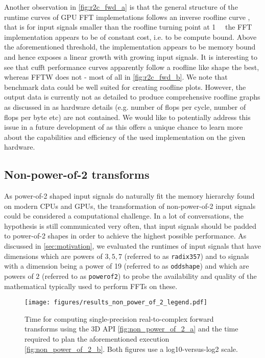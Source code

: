 Another observation in \cref{fig:r2c_fwd_a} is that the general structure of the runtime curves of GPU FFT implemetations follows an inverse roofline curve \cite{williams2009roofline}, that is for input signals smaller than the roofline turning point at \SI{1}{\mebi\byte} the FFT implementation appears to be of constant cost, i.e. to be compute bound. Above the aforementioned threshold, the implementation appears to be memory bound and hence exposes a linear growth with growing input signals. It is interesting to see that cufft performance curves apparently follow a roofline like shape the best, whereas FFTW does not - most of all in \cref{fig:r2c_fwd_b}.  We note that \gearshifft{} benchmark data could be well suited for creating roofline plots. However, the output data is currently not as detailed to produce comprehensive roofline graphs as discussed in \cite{ofenbeck2014applying} as hardware details (e.g. number of flops per cycle, number of flops per byte etc) are not contained. We would like to potentially address this issue in a future development of \gearshifft{} as this offers a unique chance to learn more about the capabilities and efficiency of the used implementation on the given hardware. 
 
\subsection{Non-power-of-2 transforms}
\label{ssec:nonpowerof2}

As power-of-2 shaped input signals do naturally fit the memory hierarchy found on modern CPUs and GPUs, the transformation of non-power-of-2 input signals could be considered a computational challenge. In a lot of conversations, the hypothesis is still communicated very often, that input signals should be padded to power-of-2 shapes in order to achieve the highest possible performance. As discussed in \cref{sec:motivation}, we evaluated the runtimes of input signals that have dimensions which are powers of $3,5,7$ (referred to as \texttt{radix357}) and to signals with a dimension being a power of 19 (referred to as \texttt{oddshape}) and which are powers of $2$ (referred to as \texttt{powerof2}) to probe the availability and quality of the mathematical typically used to perform FFTs on these. 

\begin{figure}[!tbp]
  \centering
  \texttt{[image: figures/results\_non\_power\_of\_2\_legend.pdf]}\vspace{-1em}
  \hfill
  \caption{Time for computing single-precision real-to-complex forward transforms using the 3D API \cref{fig:non_power_of_2_a} and the time required to plan the aforementioned execution \cref{fig:non_power_of_2_b}. Both figures use a log10-versus-log2 scale.}
  \label{fig:non_power_of_2}
\end{figure}

